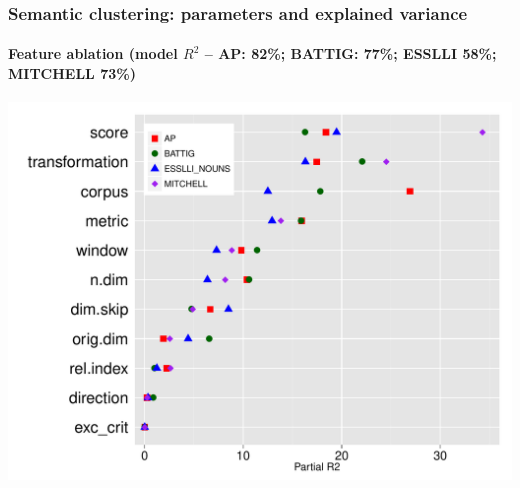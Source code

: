 \documentclass[t]{beamer} %
\begin{document}
\begin{frame}
  \frametitle{Semantic clustering: parameters and explained variance}
  \framesubtitle{Feature ablation  (model $R^{2}$ -- AP: 82\%;  BATTIG: 77\%; ESSLLI  58\%; MITCHELL 73\%)}

  \centering
  \hspace*{-10pt}
  \includegraphics[scale=0.45]{img/lapesa_clustering_main_r2_reduced}
\end{frame}
\end{document}
